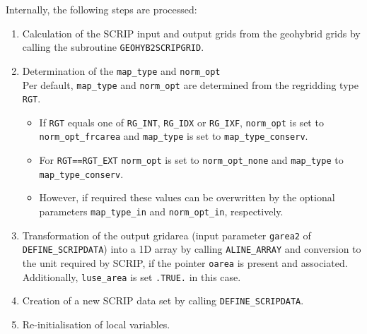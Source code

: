 \documentclass[11pt,twoside]{article}
\begin{document}
Internally, the following steps are processed:
\begin{enumerate}
\item Calculation of the SCRIP input and output grids from the
geohybrid grids by calling the subroutine \verb|GEOHYB2SCRIPGRID|.
\item Determination of the \verb|map_type| and \verb|norm_opt|\\
Per default,  \verb|map_type| and  \verb|norm_opt| are determined from
the regridding type \verb|RGT|. 
\begin{itemize}
\item If \verb|RGT| equals one
of \verb|RG_INT|,  \verb|RG_IDX| or  \verb|RG_IXF|, \verb|norm_opt| is
set to \verb|norm_opt_frcarea| and \verb|map_type| is set
to \verb|map_type_conserv|. 
\item For \verb|RGT==RGT_EXT|  \verb|norm_opt|
is set to \verb|norm_opt_none| and \verb|map_type|
to \verb|map_type_conserv|. 
\item However, if required these values can
be overwritten by the optional parameters \verb|map_type_in|
and \verb|norm_opt_in|, respectively.
\end{itemize}
\item Transformation of the output gridarea (input parameter \verb|garea2|
of \verb|DEFINE_SCRIPDATA|) into a 1D array by
calling \verb|ALINE_ARRAY| and conversion to the unit required by
SCRIP, if the pointer \verb|oarea| is present and associated.
  Additionally, \verb|luse_area| is set \verb|.TRUE.| in this case.
\item Creation of a new SCRIP data set by
calling \verb|DEFINE_SCRIPDATA|.
\item Re-initialisation of local variables.
\end{enumerate}


\end{document}
